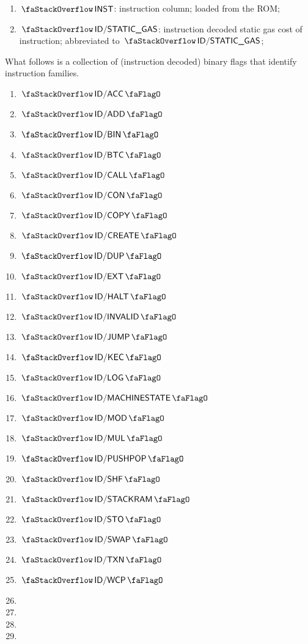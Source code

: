\begin{enumerate}[resume]
	\item $\stackInst{}$:
		instruction column; loaded from the ROM;
	\item $\stackSTATICGAS$:
		instruction decoded static gas cost of instruction;
		abbreviated to $\stackStaticGas{}$;
\end{enumerate}
What follows is a collection of (instruction decoded) binary flags that identify instruction families.
\begin{multicols}{4}
	\begin{enumerate}[resume]
		\item $\stackDecAccFlag$
		\item $\stackDecAddFlag$
		\item $\stackDecBinFlag$
		\item $\stackDecBtcFlag$
		\item $\stackDecCallFlag$
		\item $\stackDecConFlag$
		\item $\stackDecCopyFlag$
		\item $\stackDecCreateFlag$
		\item $\stackDecDupFlag$
		\item $\stackDecExtFlag$
		\item $\stackDecHaltFlag$
		\item $\stackDecInvalidFlag$
		\item $\stackDecJumpFlag$
		\item $\stackDecKecFlag$
		\item $\stackDecLogFlag$
		\item $\stackDecMachineStateFlag$
		\item $\stackDecModFlag$
		\item $\stackDecMulFlag$
		\item $\stackDecPushPopFlag$
		\item $\stackDecShfFlag$
		\item $\stackDecStackRamFlag$
		\item $\stackDecStoFlag$
		\item $\stackDecSwapFlag$
		\item $\stackDecTxnFlag$
		\item $\stackDecWcpFlag$
		\item[\vspace{\fill}]
		\item[\vspace{\fill}]
		\item[\vspace{\fill}]
		\item[\vspace{\fill}]
	\end{enumerate}
\end{multicols}

